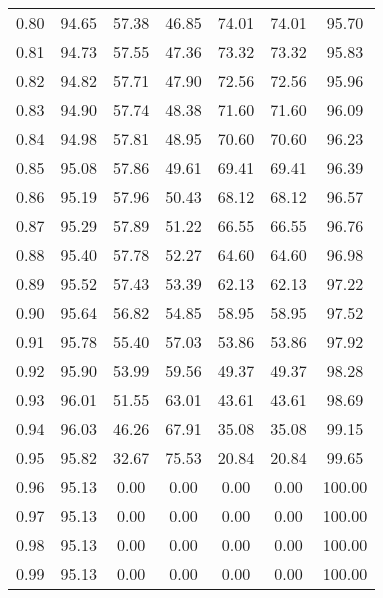 \begin{tabular}{|c|c|c|c|c|c|c|}
      0.80 &     94.65 &     57.38 &      46.85 &   74.01 &      74.01 &         95.70 \\
      0.81 &     94.73 &     57.55 &      47.36 &   73.32 &      73.32 &         95.83 \\
      0.82 &     94.82 &     57.71 &      47.90 &   72.56 &      72.56 &         95.96 \\
      0.83 &     94.90 &     57.74 &      48.38 &   71.60 &      71.60 &         96.09 \\
      0.84 &     94.98 &     57.81 &      48.95 &   70.60 &      70.60 &         96.23 \\
      0.85 &     95.08 &     57.86 &      49.61 &   69.41 &      69.41 &         96.39 \\
      0.86 &     95.19 &     57.96 &      50.43 &   68.12 &      68.12 &         96.57 \\
      0.87 &     95.29 &     57.89 &      51.22 &   66.55 &      66.55 &         96.76 \\
      0.88 &     95.40 &     57.78 &      52.27 &   64.60 &      64.60 &         96.98 \\
      0.89 &     95.52 &     57.43 &      53.39 &   62.13 &      62.13 &         97.22 \\
      0.90 &     95.64 &     56.82 &      54.85 &   58.95 &      58.95 &         97.52 \\
      0.91 &     95.78 &     55.40 &      57.03 &   53.86 &      53.86 &         97.92 \\
      0.92 &     95.90 &     53.99 &      59.56 &   49.37 &      49.37 &         98.28 \\
      0.93 &     96.01 &     51.55 &      63.01 &   43.61 &      43.61 &         98.69 \\
      0.94 &     96.03 &     46.26 &      67.91 &   35.08 &      35.08 &         99.15 \\
      0.95 &     95.82 &     32.67 &      75.53 &   20.84 &      20.84 &         99.65 \\
      0.96 &     95.13 &      0.00 &       0.00 &    0.00 &       0.00 &        100.00 \\
      0.97 &     95.13 &      0.00 &       0.00 &    0.00 &       0.00 &        100.00 \\
      0.98 &     95.13 &      0.00 &       0.00 &    0.00 &       0.00 &        100.00 \\
      0.99 &     95.13 &      0.00 &       0.00 &    0.00 &       0.00 &        100.00 \\
\bottomrule
\end{tabular}
